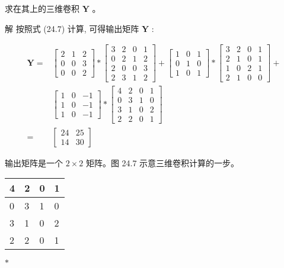 \documentclass[10pt]{article}
\begin{document}
求在其上的三维卷积 $\boldsymbol{Y}$ 。

解 按照式 (24.7) 计算, 可得输出矩阵 $\boldsymbol{Y}$ :

$$
\begin{aligned}
\boldsymbol{Y}= & {\left[\begin{array}{lll}
2 & 1 & 2 \\
0 & 0 & 3 \\
0 & 0 & 2
\end{array}\right] *\left[\begin{array}{cccc}
3 & 2 & 0 & 1 \\
0 & 2 & 1 & 2 \\
2 & 0 & 0 & 3 \\
2 & 3 & 1 & 2
\end{array}\right]+\left[\begin{array}{lll}
1 & 0 & 1 \\
0 & 1 & 0 \\
1 & 0 & 1
\end{array}\right] *\left[\begin{array}{llll}
3 & 2 & 0 & 1 \\
2 & 1 & 0 & 1 \\
1 & 0 & 2 & 1 \\
2 & 1 & 0 & 0
\end{array}\right]+} \\
& {\left[\begin{array}{ccc}
1 & 0 & -1 \\
1 & 0 & -1 \\
1 & 0 & -1
\end{array}\right] *\left[\begin{array}{llll}
4 & 2 & 0 & 1 \\
0 & 3 & 1 & 0 \\
3 & 1 & 0 & 2 \\
2 & 2 & 0 & 1
\end{array}\right] } \\
= & {\left[\begin{array}{ll}
24 & 25 \\
14 & 30
\end{array}\right] }
\end{aligned}
$$

输出矩阵是一个 $2 \times 2$ 矩阵。图 24.7 示意三维卷积计算的一步。

\begin{center}
\begin{tabular}{|l|l|l|l|}
\hline
4 & 2 & 0 & 1 \\
\hline
0 & 3 & 1 & 0 \\
\hline
3 & 1 & 0 & 2 \\
\hline
2 & 2 & 0 & 1 \\
\hline
\end{tabular}
\end{center}$*$
\end{document}
